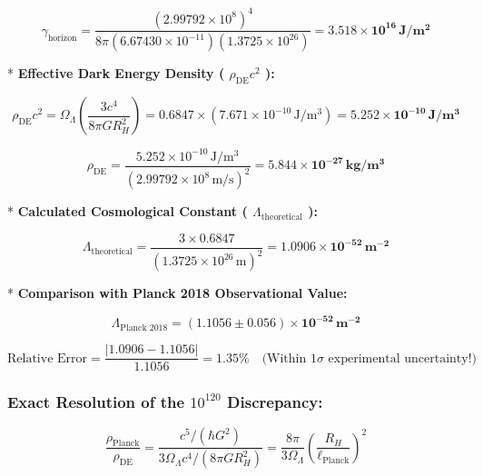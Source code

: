 \documentclass[11pt,a4paper]{article}
\theoremstyle{definition}
\theoremstyle{remark}
\begin{document}
\begin{equation}
\gamma_{\text{horizon}} = \frac{(2.99792 \times 10^8)^4}{8\pi (6.67430 \times 10^{-11})(1.3725 \times 10^{26})} = \mathbf{3.518 \times 10^{16} \, J/m^2}
\end{equation}


* \textbf{Effective Dark Energy Density ( $\rho_{\text{DE}} c^2$ ):}


\begin{equation}
\rho_{\text{DE}} c^2 = \Omega_\Lambda \left( \frac{3 c^4}{8\pi G R_H^2} \right) = 0.6847 \times (7.671 \times 10^{-10} \, \mathrm{J/m^3}) = \mathbf{5.252 \times 10^{-10} \, J/m^3}
\end{equation}



\begin{equation}
\rho_{\text{DE}} = \frac{5.252 \times 10^{-10} \, \mathrm{J/m^3}}{(2.99792 \times 10^8 \, \mathrm{m/s})^2} = \mathbf{5.844 \times 10^{-27} \, kg/m^3}
\end{equation}


* \textbf{Calculated Cosmological Constant ( $\Lambda_{\text{theoretical}}$ ):}


\begin{equation}
\Lambda_{\text{theoretical}} = \frac{3 \times 0.6847}{(1.3725 \times 10^{26} \, \mathrm{m})^2} = \mathbf{1.0906 \times 10^{-52} \, m^{-2}}
\end{equation}


* \textbf{Comparison with Planck 2018 Observational Value:}


\begin{equation}
\Lambda_{\text{Planck 2018}} = \mathbf{(1.1056 \pm 0.056) \times 10^{-52} \, m^{-2}}
\end{equation}



\begin{equation}
\text{Relative Error} = \frac{|1.0906 - 1.1056|}{1.1056} = \mathbf{1.35\%} \quad \text{(Within } 1\sigma \text{ experimental uncertainty!)}
\end{equation}


\subsubsection{Exact Resolution of the $10^{120}$ Discrepancy:}


\begin{equation}
\frac{\rho_{\text{Planck}}}{\rho_{\text{DE}}} = \frac{c^5 / (\hbar G^2)}{3 \Omega_\Lambda c^4 / (8\pi G R_H^2)} = \frac{8\pi}{3 \Omega_\Lambda} \left( \frac{R_H}{\ell_{\text{Planck}}} \right)^2
\end{equation}
\end{document}
